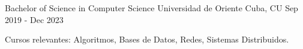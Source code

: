 
\begin{cventries}
  \cventry
    {Bachelor of Science in Computer Science} %
    {Universidad de Oriente} %
    {Cuba, CU} %
    {Sep 2019 - Dec 2023} %
    {
      \begin{cvitems} %
        \item{Cursos relevantes: Algoritmos, Bases de Datos, Redes, Sistemas Distribuidos.}
      \end{cvitems}
    }
\end{cventries}
